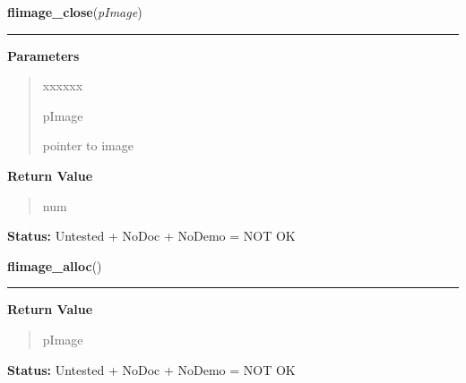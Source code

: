 \hspace{.8\funcindent}\begin{boxedminipage}{\funcwidth}

    \raggedright \textbf{flimage\_close}(\textit{pImage})

    \vspace{-1.5ex}

    \rule{\textwidth}{0.5\fboxrule}
\setlength{\parskip}{2ex}
\setlength{\parskip}{1ex}
      \textbf{Parameters}
      \vspace{-1ex}

      \begin{quote}
        \begin{Ventry}{xxxxxx}

          \item[pImage]

          pointer to image

        \end{Ventry}

      \end{quote}

      \textbf{Return Value}
    \vspace{-1ex}

      \begin{quote}
      num

      \end{quote}

\textbf{Status:} Untested + NoDoc + NoDemo = NOT OK



    \end{boxedminipage}

    \label{xformslib:flflimage:flimage_alloc}

    \vspace{0.5ex}

\hspace{.8\funcindent}\begin{boxedminipage}{\funcwidth}

    \raggedright \textbf{flimage\_alloc}()

    \vspace{-1.5ex}

    \rule{\textwidth}{0.5\fboxrule}
\setlength{\parskip}{2ex}
\setlength{\parskip}{1ex}
      \textbf{Return Value}
    \vspace{-1ex}

      \begin{quote}
      pImage

      \end{quote}

\textbf{Status:} Untested + NoDoc + NoDemo = NOT OK



    \end{boxedminipage}

